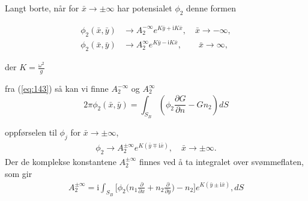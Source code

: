 Langt borte, når for $\bar{x} \rightarrow \pm \infty$ har potensialet $\phi_2$  denne formen

\begin{align}
	\phi_2(\bar{x},\bar{y}) &\rightarrow A_2^{-\infty} e^{K\bar{y} + \mathrm{i} K\bar{x}}, \quad \bar{x} \rightarrow -\infty, \\
	\phi_2(\bar{x},\bar{y}) &\rightarrow A_2^{\infty} e^{K\bar{y} - \textsf{i} K\bar{x}}, \qquad \bar{x} \rightarrow \infty,
\end{align}

der $K = \frac{\omega^2}{g}$

fra (\ref{eq:143}) så kan vi finne $A_2^{-\infty}$ og $A_2^{\infty}$
\begin{equation}
    2\pi \phi_2(\bar{x},\bar{y})  = \int_{S_B}  ( \phi_2  \frac{\partial G }{\partial n}-G n_2 )dS
\end{equation}

oppførselen til $\phi_j$ for $\bar{x} \rightarrow \pm \infty$,
\begin{align}
\phi_2 \rightarrow A_2^{\pm \infty} e^{K (\bar{y} \mp \mathrm{i}  \bar{x}) }, \quad \bar{x} \rightarrow \pm \infty.
\end{align}
Der de komplekse konstantene $A_2^{\pm \infty}$ finnes ved å ta integralet over svømmeflaten, som gir
\begin{align}
A_2^{\pm \infty} =  \mathrm{i} \int_{S_B}   \bigg[ \phi_2  \Big(  n_1 \frac{\partial }{\partial x}  +  n_2\frac{\partial }{\partial y} \Big) - n_2 \bigg]  e^{K (\bar{y} \pm \mathrm{i}  \bar{x}) },dS
\end{align}



